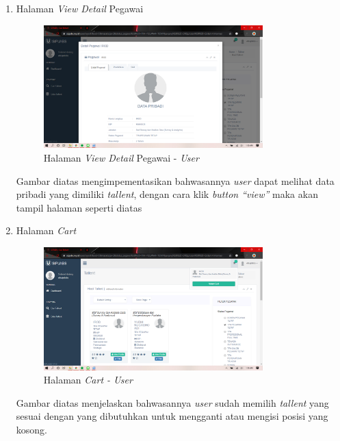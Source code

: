 \begin{enumerate}
	\item Halaman\textit{ View Detail} Pegawai
	\begin{figure}
		\centering
		\includegraphics[width=0.8\textwidth]
		{pics/user/implementasi/viewdetailpegawai.png}
		\caption{Halaman \textit{View Detail} Pegawai - \textit{User}}
		\label{fig:CC10}
	\end{figure}
	
	Gambar diatas mengimpementasikan bahwasannya \textit{user} dapat melihat data pribadi yang dimiliki \textit{tallent}, dengan cara klik\textit{ button “view”} maka akan tampil halaman seperti diatas
	
	\item Halaman \textit{Cart}
	\begin{figure}
		\centering
		\includegraphics[width=0.8\textwidth]
		{pics/user/implementasi/cartuser.png}
		\caption{Halaman \textit{Cart - User}}
		\label{fig:CC10}
	\end{figure}
	
	Gambar diatas menjelaskan bahwasannya \textit{user} sudah memilih \textit{tallent} yang sesuai dengan yang dibutuhkan untuk mengganti atau mengisi posisi yang kosong.  
	

\end{enumerate}
